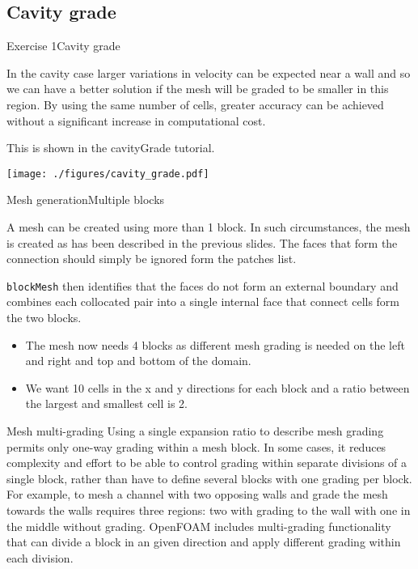 \documentclass{beamer}
\begin{document}
\subsection{Cavity grade}
\begin{frame}{Exercise 1}{Cavity grade}

In the cavity case larger variations in velocity can be expected near
a wall and so we can have a better solution if the mesh will be graded
to be smaller in this region. By using the same number of cells,
greater accuracy can be achieved without a significant increase in
computational cost.

This is shown in the cavityGrade tutorial.

\vspace{-0.2cm}
\begin{center}
  \texttt{[image: ./figures/cavity\_grade.pdf]}
\end{center} 

\end{frame}

\begin{frame}{Mesh generation}{Multiple blocks}

A mesh can be created using more than 1 block. In such circumstances,
the mesh is created as has been described in the previous slides. The
faces that form the connection should simply be ignored form the
patches list.  

\texttt{blockMesh} then identifies that the faces do not form an
external boundary and combines each collocated pair into a single
internal face that connect cells form the two blocks. 

\begin{itemize}
\item The mesh now needs 4 blocks as different mesh grading is needed
  on the left and right and top and bottom of the domain.  
\item We want 10 cells in the x and y directions for each block and a
  ratio between the largest and smallest cell is 2.
\end{itemize}

\end{frame}

\begin{frame}{Mesh multi-grading}
Using a single expansion ratio to describe mesh grading permits only one-way grading within a mesh block. In some cases, it reduces complexity and effort to be able to control grading within separate divisions of a single block, rather than have to define several blocks with one grading per block. For example, to mesh a channel with two opposing walls and grade the mesh towards the walls requires three regions: two with grading to the wall with one in the middle without grading.
OpenFOAM includes multi-grading functionality that can divide a block in an given direction and apply different grading within each division. 
\end{frame}
\end{document}
